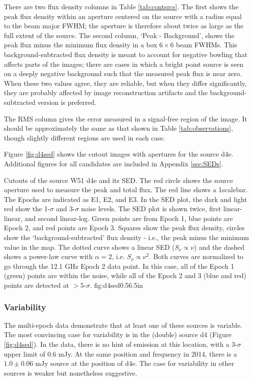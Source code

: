 There are two flux density columns in Table \ref{tab:contsrcs}.  The first
shows the peak flux density
within an aperture centered on the source with a radius equal to the beam major
FWHM; the aperture is therefore about twice as large as the full extent of the
source.  The second column, `Peak - Background', shows the peak flux minus the
minimum flux density in a box $6\times6$ beam FWHMs.  This
background-subtracted flux density is meant to account for negative bowling
that affects parts of the images; there are cases in which a bright point
source is seen on a deeply negative background such that the measured peak flux
is near zero.  When these two values agree, they are reliable, but when they
differ significantly, they are probably affected by image reconstruction
artifacts and the background-subtracted version is preferred.

The RMS column gives the error measured in a signal-free region of the image.
It should be approximately the same as that shown in Table
\ref{tab:observations}, though slightly different regions are used in each
case.



Figure \ref{fig:d4sed} shows the cutout images with apertures for the source
d4e.  Additional figures for all candidates are included in Appendix
\ref{sec:SEDs}.

{Cutouts of the source W51 d4e and its SED.
The red circle shows the source aperture used to measure the peak and total
flux.  The red line shows a 1\arcsec scalebar.  The Epochs are indicated as E1,
E2, and E3.
In the SED plot, the dark and light red show the 1-$\sigma$ and 3-$\sigma$
noise levels.  The SED plot is shown twice, first linear-linear, and second
linear-log.
Green points are from Epoch 1, blue points are Epoch 2, and red points are
Epoch 3.  Squares show the peak flux density, circles show the
`background-subtracted' flux density - i.e., the peak minus the minimum value
in the map.
The dotted curve shows a linear SED ($S_\nu \propto \nu$) and the dashed shows
a power-law curve with $\alpha=2$, i.e. $S_\nu \propto \nu^2$.  Both curves are
normalized to go through the 12.1 GHz Epoch 2 data point.  In this case, all of
the Epoch 1 (green) points are within the noise, while all of the Epoch 2 and 3
(blue and red) points are detected at $>5$-$\sigma$.
}
{fig:d4sed}{0.5}{6.5in}

\subsubsection{Variability}
\label{sec:variability}
The multi-epoch data demonstrate that at least one of these sources is
variable.  The most convincing case for variability is in the (double) source
d4 (Figure \ref{fig:d4sed}).  In the \citet{Mehringer1994a} data, there is no
hint of emission at this location, with a 3-$\sigma$ upper limit of 0.6 mJy.
At the same position and frequency in 2014, there is a $1.0 \pm 0.06$ mJy
source at the position of d4e.  The case for variability in other sources is
weaker but nonetheless suggestive.


